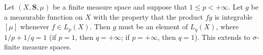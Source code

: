 Let $(X, \mathbf{S}, \mu)$ be a finite measure space and suppose that $1 \leq p < +\infty$. Let $g$ be a measurable function on $X$ with the property that the product $fg$ is integrable $[\mu]$ whenever $f \in L_p(X)$. Then $g$ must be an element of $L_q(X)$, where $1/p + 1/q = 1$ (if $p = 1$, then $q = +\infty$; if $p = +\infty$, then $q = 1$). This extends to $\sigma$-finite measure spaces.
